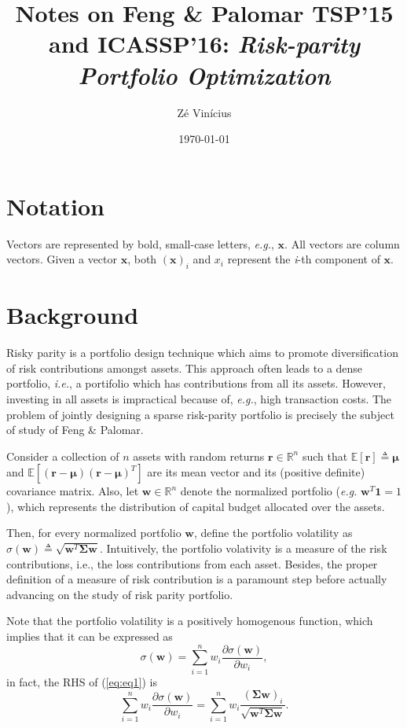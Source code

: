 \documentclass{article}
\title{Notes on Feng \& Palomar TSP'15 and ICASSP'16: \textit{Risk-parity Portfolio Optimization}}
\author{Z\'e Vin\'icius}
\date{\today}
\begin{document}
\maketitle

\section*{Notation}
Vectors are represented by bold, small-case letters, {\it e.g.}, $\bm{x}$.
All vectors are column vectors. Given a vector $\bm{x}$, both $(\bm{x})_{i}$ and
$x_i$ represent the {\it i}-th component of $\bm{x}$.

\section{Background}

Risky parity is a portfolio design technique which aims to promote
diversification of risk contributions amongst assets. This approach often
leads to a dense portfolio, {\it i.e.}, a portifolio which has contributions from all
its assets.
However, investing in all assets is impractical because of, {\it e.g.}, high transaction
costs.
The problem of jointly designing a sparse risk-parity portfolio is precisely the
subject of study of Feng \& Palomar.

Consider a collection of $n$ assets with random returns
$\bm{r} \in \mathbb{R}^{n}$ such that $\mathbb{E}[\bm{r}] \triangleq \bm{\mu}$ and
$\mathbb{E}\left[(\bm{r} - \bm{\mu})(\bm{r} - \bm{\mu})^{T}\right]$
are its mean vector and its (positive definite) covariance matrix. Also,
let $\bm{w} \in \mathbb{R}^{n}$ denote the normalized portfolio (\textit{e.g.} $\bm{w}^{T}\bm{1} = 1$), which represents the distribution of capital budget
allocated over the assets.

Then, for every normalized portfolio $\bm{w}$, define the portfolio volatility
as $\sigma(\bm{w}) \triangleq \sqrt{\bm{w}^{T}\bm{\Sigma}\bm{w}}$.
Intuitively, the portfolio volativity is a measure of the risk contributions,
i.e., the loss contributions from each asset. Besides, the proper definition
of a measure of risk contribution is a paramount step before actually advancing
on the study of risk parity portfolio.

Note that the portfolio volatility is a positively homogenous function, which
implies that it can be expressed as
\begin{equation}
\sigma(\bm{w}) = \sum_{i=1}^{n}w_{i}\dfrac{\partial \sigma(\bm{w})}{\partial w_i},
\label{eq:eq1}
\end{equation}
in fact, the RHS of (\ref{eq:eq1}) is
\begin{equation}
\sum_{i=1}^{n}w_{i}\dfrac{\partial \sigma(\bm{w})}{\partial w_i} = \sum_{i=1}^{n}
w_i \dfrac{(\bm{\Sigma}{\bm{w}})_{i}}{\sqrt{\bm{w}^{T}\bm{\Sigma}\bm{w}}}.
\label{eq:eq2}
\end{equation}
\end{document}
